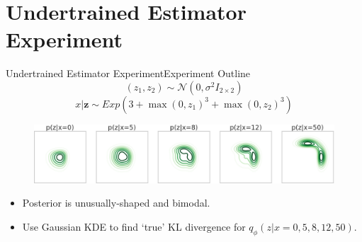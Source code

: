 \documentclass[handout]{beamer}
\begin{document}
\section{Undertrained Estimator Experiment}
\begin{frame}{Undertrained Estimator Experiment}{Experiment Outline}
\[(z_1,z_2)\sim \mathcal{N} (0,\sigma^2 I_{2\times 2})\]
\[x|\bm{z}\sim Exp(3+\max(0,z_1)^3+\max(0,z_2)^3)\]
\begin{figure}[h]
\includegraphics[width=\textwidth]{sprinklertrue.png}
\end{figure}
\begin{itemize}
\item Posterior is unusually-shaped and bimodal.
\item Use Gaussian KDE to find `true' KL divergence for $q_\phi(z|x=0,5,8,12,50)$.
\end{itemize}
\end{frame}
\end{document}
